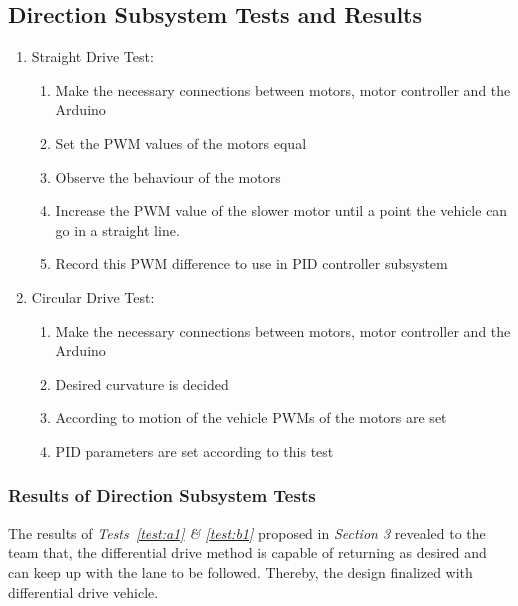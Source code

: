 \documentclass[a4paper,12pt]{article}
\begin{document}


\subsection {Direction Subsystem Tests and Results}
	\begin{enumerate}
		\item Straight Drive Test: \label{test:a1}	
		\begin{enumerate}
			\item Make the necessary connections between motors, motor controller and the Arduino  
			\item Set the PWM values of the motors equal  
			\item Observe the behaviour of the motors  
			\item Increase the PWM value of the slower motor until a point the vehicle can go in a straight line.
			\item Record this PWM difference to use in PID controller subsystem
		\end{enumerate}

		\item Circular Drive Test: \label{test:b1}	
		\begin{enumerate}
			\item Make the necessary connections between motors, motor controller and the Arduino  
			\item Desired curvature is decided  
			\item  According to motion of the vehicle PWMs of the motors are set  
			\item  PID parameters are set according to this test
		\end{enumerate}
	\end{enumerate}

\subsubsection*{Results of Direction Subsystem Tests}

	The results of \textit{Tests~\ref{test:a1} \& \ref{test:b1}} proposed in \textit{Section 3} revealed to the team that, the differential drive method is capable of returning as desired and can keep up with the lane to be followed. Thereby, the design finalized with differential drive vehicle.


\end{document}
